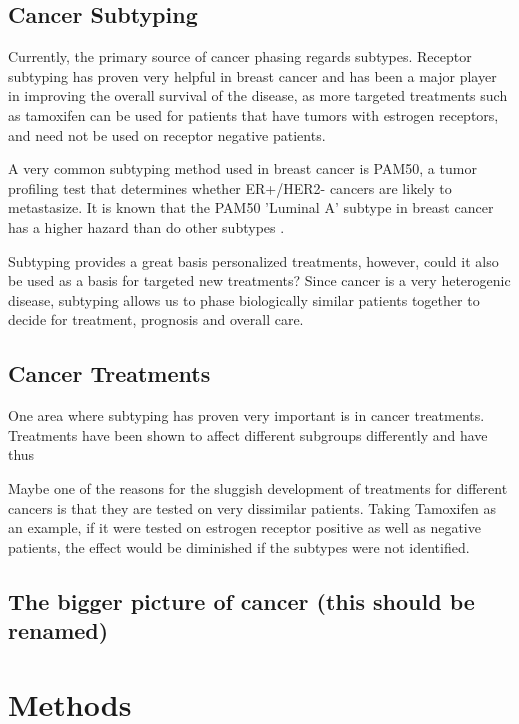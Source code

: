 \documentclass{kththesis}
\begin{document}
    \section{Cancer Subtyping}
    Currently, the primary source of cancer phasing regards subtypes. Receptor subtyping has proven very helpful in breast cancer and has been a major player in improving the overall survival of the disease, as more targeted treatments such as tamoxifen can be used for patients that have tumors with estrogen receptors, and need not be used on receptor negative patients.

    A very common subtyping method used in breast cancer is PAM50, a tumor profiling test that determines whether ER+/HER2- cancers are likely to metastasize. It is known that the PAM50 'Luminal A' subtype in breast cancer has a higher hazard than do other subtypes \cite{RN57}.

    Subtyping provides a great basis personalized treatments, however, could it also be used as a basis for targeted new treatments? Since cancer is a very heterogenic disease, subtyping allows us to phase biologically similar patients together to decide for treatment, prognosis and overall care.


    \section{Cancer Treatments}
    One area where subtyping has proven very important is in cancer treatments. Treatments have been shown to affect different subgroups differently and have thus



    Maybe one of the reasons for the sluggish development of treatments for different cancers is that they are tested on very dissimilar patients. Taking Tamoxifen as an example, if it were tested on estrogen receptor positive as well as negative patients, the effect would be diminished if the subtypes were not identified.

    \section{The bigger picture of cancer (this should be renamed)}




    \section{}


\chapter{Methods}
\end{document}
